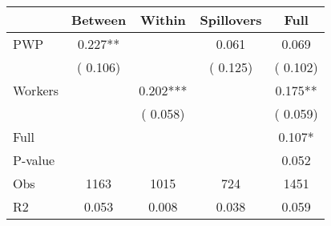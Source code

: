 
\begin{tabular}{l*{4}{c}}\hline&\multicolumn{1}{c}{Between}&\multicolumn{1}{c}{Within}&\multicolumn{1}{c}{Spillovers}&\multicolumn{1}{c}{Full}\\ \hline
 PWP           &              0.227**      &                                               &        0.061 &         0.069                            \\ 
                               &        (       0.106)           &                                       &       (       0.125)     &      (       0.102)                                           \\ 
 Workers       &                                               &        0.202***    &                                &             0.175**                            \\ 
                               &                                               & (       0.058)                  &                                        &      (       0.059)                                           \\ 
\hline                                                                                                                                                                                                                                            
 Full                  &                                               &                                               &                                        &             0.107*                                     \\ 
 P-value               &                                               &                                               &                                        &             0.052                                           \\ 
 Obs                   &               1163               &       1015                       &       724                &              1451                                               \\ 
 R2                    &                      0.053              &              0.008                      &              0.038               &                     0.059                                              \\ 
\hline \end{tabular}                                                                                                                                                                                                              